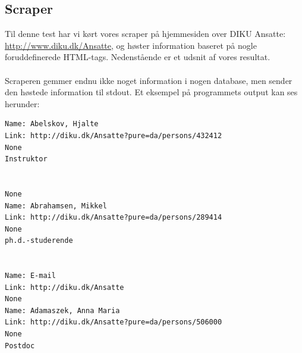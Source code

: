 \documentclass[11pt]{article}
\begin{document}
\subsection{Scraper}
Til denne test har vi kørt vores scraper på hjemmesiden over DIKU Ansatte: \url{http://www.diku.dk/Ansatte}, og høster information baseret på nogle foruddefinerede HTML-tags. Nedenstående er et udsnit af vores resultat. \\ \\
Scraperen gemmer endnu ikke noget information i nogen database, men sender den høstede information til stdout. Et eksempel på programmets output kan ses herunder:
\begin{lstlisting}
Name: Abelskov, Hjalte
Link: http://diku.dk/Ansatte?pure=da/persons/432412
None
Instruktor


None
Name: Abrahamsen, Mikkel
Link: http://diku.dk/Ansatte?pure=da/persons/289414
None
ph.d.-studerende


Name: E-mail
Link: http://diku.dk/Ansatte
None
Name: Adamaszek, Anna Maria
Link: http://diku.dk/Ansatte?pure=da/persons/506000
None
Postdoc
\end{lstlisting}
\end{document}
